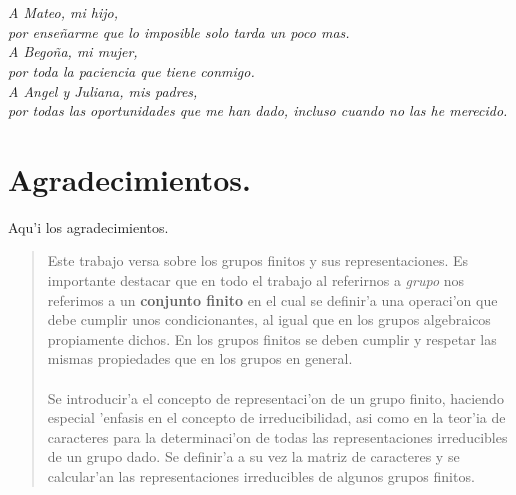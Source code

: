 \documentclass[a4paper,openright,12pt]{report}
\numberwithin{equation}{section} %
\begin{document}
\chapter*{}
\begin{flushright}
\textit{A Mateo, mi hijo, \\
por ense\~narme que lo imposible solo tarda un poco mas.\\
A Bego\~na, mi mujer, \\
por toda la paciencia que tiene conmigo.\\
A Angel y Juliana, mis padres, \\
por todas las oportunidades que me han dado, incluso cuando no las he merecido.}
\end{flushright}
\chapter*{Agradecimientos.} 
Aqu'i los agradecimientos.
\begin{abstract}
Este trabajo versa sobre los grupos finitos y sus representaciones. Es importante destacar que en todo el trabajo al referirnos a \textit{grupo} nos referimos a un  \textbf{conjunto finito} en el cual se definir'a una operaci'on que debe cumplir unos condicionantes, al igual que en los grupos algebraicos propiamente dichos. En los grupos finitos se deben cumplir y respetar las mismas propiedades que en los grupos en general.\\
\\
Se introducir'a el concepto de representaci'on de un grupo finito, haciendo especial 'enfasis en el concepto de irreducibilidad, asi como en la teor'ia de caracteres para la determinaci'on de todas las representaciones irreducibles de un grupo dado. Se definir'a a su vez la matriz de caracteres y se calcular'an las representaciones irreducibles de algunos grupos finitos. 
\end{abstract}
\tableofcontents
\end{document}
